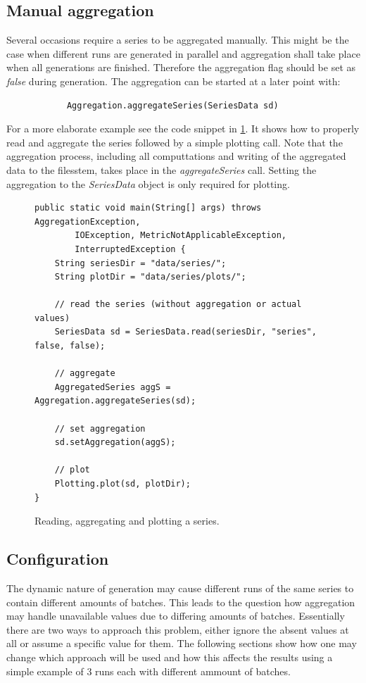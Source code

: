 \subsection{Manual aggregation}
Several occasions require a series to be aggregated manually. This might be the case when different runs are generated in parallel and aggregation shall take place when all generations are finished. Therefore the aggregation flag should be set as \emph{false} during generation. The aggregation can be started at a later point with:
\begin{lstlisting}
			Aggregation.aggregateSeries(SeriesData sd)
\end{lstlisting}
For a more elaborate example see the code snippet in \ref{code:example2}. It shows how to properly read and aggregate the series followed by a simple plotting call. Note that the aggregation process, including all computtations and writing of the aggregated data to the filesstem, takes place in the \emph{aggregateSeries} call. Setting the aggregation to the \emph{SeriesData} object is only required for plotting.
\begin{figure} [h]
\begin{lstlisting}
public static void main(String[] args) throws AggregationException,
		IOException, MetricNotApplicableException,
		InterruptedException {
	String seriesDir = "data/series/";
	String plotDir = "data/series/plots/";
	
	// read the series (without aggregation or actual values)
	SeriesData sd = SeriesData.read(seriesDir, "series", false, false);
	
	// aggregate
	AggregatedSeries aggS = Aggregation.aggregateSeries(sd);

	// set aggregation
	sd.setAggregation(aggS);	
	
	// plot
	Plotting.plot(sd, plotDir);
}
\end{lstlisting}
\caption{Reading, aggregating and plotting a series.}
\label{code:example2}
\end{figure}




\subsection{Configuration}
The dynamic nature of generation may cause different runs of the same series to contain different amounts of batches. This leads to the question how aggregation may handle unavailable values due to differing amounts of batches. Essentially there are two ways to approach this problem, either ignore the absent values at all or assume a specific value for them. The following sections show how one may change which approach will be used and how this affects the results using a simple example of 3 runs each with different ammount of batches.

